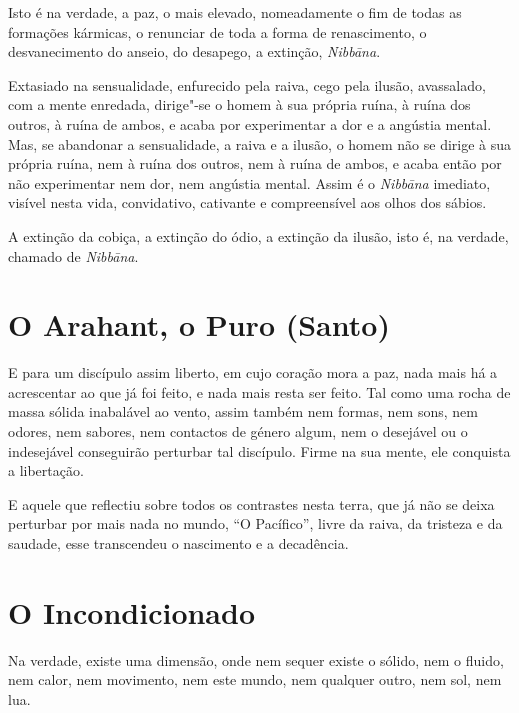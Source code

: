 Isto é na verdade, a paz, o mais elevado, nomeadamente o fim de todas as
formações kármicas, o renunciar de toda a forma de renascimento, o
desvanecimento do anseio, do desapego, a extinção, \emph{Nibbāna}.


Extasiado na sensualidade, enfurecido pela raiva, cego pela ilusão, avassalado,
com a mente enredada, dirige"-se o homem à sua própria ruína, à ruína dos outros,
à ruína de ambos, e acaba por experimentar a dor e a angústia mental. Mas, se
abandonar a sensualidade, a raiva e a ilusão, o homem não se dirige à sua
própria ruína, nem à ruína dos outros, nem à ruína de ambos, e acaba então por
não experimentar nem dor, nem angústia mental. Assim é o \emph{Nibbāna}
imediato, visível nesta vida, convidativo, cativante e compreensível aos olhos
dos sábios.


A extinção da cobiça, a extinção do ódio, a extinção da ilusão, isto é, na
verdade, chamado de \emph{Nibbāna}.


\clearpage

\section{O Arahant, o Puro (Santo)}

E para um discípulo assim liberto, em cujo coração mora a paz, nada mais há a
acrescentar ao que já foi feito, e nada mais resta ser feito. Tal como uma rocha
de massa sólida inabalável ao vento, assim também nem formas, nem sons, nem
odores, nem sabores, nem contactos de género algum, nem o desejável ou o
indesejável conseguirão perturbar tal discípulo. Firme na sua mente, ele
conquista a libertação.


E aquele que reflectiu sobre todos os contrastes nesta terra, que já não se
deixa perturbar por mais nada no mundo, “O Pacífico”, livre da raiva, da
tristeza e da saudade, esse transcendeu o nascimento e a decadência.


\section{O Incondicionado}

Na verdade, existe uma dimensão, onde nem sequer existe o sólido, nem o fluido,
nem calor, nem movimento, nem este mundo, nem qualquer outro, nem sol, nem lua.


